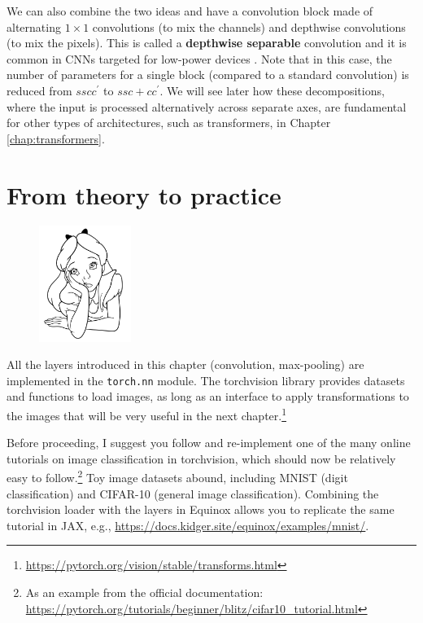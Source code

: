 We can also combine the two ideas and have a convolution block made of alternating $1 \times 1$ convolutions (to mix the channels) and depthwise convolutions (to mix the pixels). This is called a \textbf{depthwise separable} convolution and it is common in CNNs targeted for low-power devices \cite{howard2017mobilenets}. Note that in this case, the number of parameters for a single block (compared to a standard convolution) is reduced from $sscc^\prime$ to $ssc + cc^\prime$. We will see later how these decompositions, where the input is processed alternatively across separate axes, are fundamental for other types of architectures, such as transformers, in Chapter \ref{chap:transformers}.

\section*{From theory to practice}

\begin{figure}
\vspace{-3em}\includegraphics[width=3.0cm]{images/shutterstock_2075221579.jpg}
\vspace{-2em}
\end{figure}

All the layers introduced in this chapter (convolution, max-pooling) are implemented in the \texttt{torch.nn} module. The torchvision library provides datasets and functions to load images, as long as an interface to apply transformations to the images that will be very useful in the next chapter.\footnote{\url{https://pytorch.org/vision/stable/transforms.html}} 

Before proceeding, I suggest you follow and re-implement one of the many online tutorials on image classification in torchvision, which should now be relatively easy to follow.\footnote{As an example from the official documentation: \url{https://pytorch.org/tutorials/beginner/blitz/cifar10_tutorial.html}} Toy image datasets abound, including MNIST (digit classification) and CIFAR-10 (general image classification). Combining the torchvision loader with the layers in Equinox allows you to replicate the same tutorial in JAX, e.g., \url{https://docs.kidger.site/equinox/examples/mnist/}.

